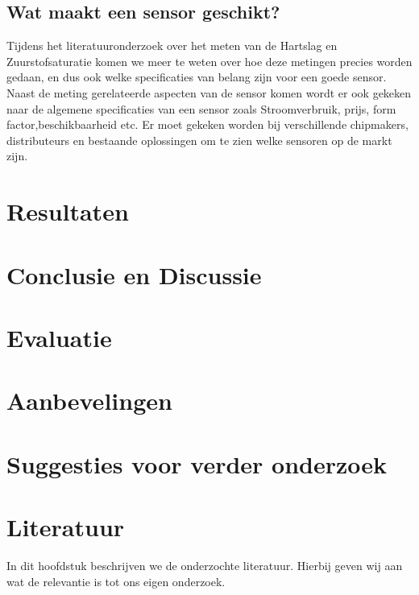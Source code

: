 \documentclass[11pt]{article}
\begin{document}
    \subsection{Wat maakt een sensor geschikt?}
    Tijdens het literatuuronderzoek over het meten van de Hartslag en Zuurstofsaturatie komen we meer te weten over hoe deze metingen precies worden gedaan, en dus ook welke specificaties van belang zijn voor een goede sensor.
    Naast de meting gerelateerde aspecten van de sensor komen wordt er ook gekeken naar de algemene specificaties van een sensor zoals Stroomverbruik, prijs, form factor,beschikbaarheid etc.
    Er moet gekeken worden bij verschillende chipmakers, distributeurs en bestaande oplossingen om te zien welke sensoren op de markt zijn.


    \section{Resultaten}\label{sec:resultaten}

    
    \section{Conclusie en Discussie}\label{sec:conclusie-en-discussie}


    \section{Evaluatie}\label{sec:evaluatie2}

    \section{Aanbevelingen}\label{sec:aanbevelingen2}


    \section{Suggesties voor verder onderzoek}\label{sec:suggesties-voor-verder-onderzoek2}


    \section{Literatuur}\label{sec:literatuur2}
    In dit hoofdstuk beschrijven we de onderzochte literatuur.
    Hierbij geven wij aan wat de relevantie is tot ons eigen onderzoek.



    

    
\end{document}
